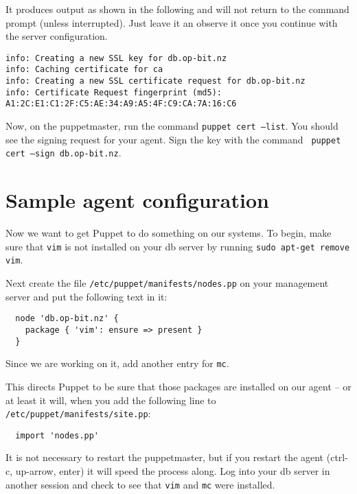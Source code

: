 \documentclass{article}
\newcommand{\domain}{op-bit.nz}
\begin{document}
It produces output as shown in the following and will not return to the command prompt (unless interrupted). Just leave it an observe it once you continue with the server configuration.

\begin{verbatim}
info: Creating a new SSL key for db.op-bit.nz
info: Caching certificate for ca
info: Creating a new SSL certificate request for db.op-bit.nz
info: Certificate Request fingerprint (md5): A1:2C:E1:C1:2F:C5:AE:34:A9:A5:4F:C9:CA:7A:16:C6

\end{verbatim}

Now, on the puppetmaster, run the command \texttt{puppet cert --list}.  You should see the signing request for your agent.  Sign the key with the command \texttt{ puppet cert --sign db.\domain}.

\section{Sample agent configuration}
Now we want to get Puppet to do something on our systems.  To begin, make sure that \texttt{vim} is not installed on your db server by running \texttt{sudo apt-get remove vim}. 

Next create the file \texttt{/etc/puppet/manifests/nodes.pp} on your management server and put the following text in it:
\begin{verbatim}
  node 'db.op-bit.nz' {
    package { 'vim': ensure => present }
  }
\end{verbatim}

Since we are working on it, add another entry for \texttt{mc}.

This directs Puppet to be sure that those packages are installed on our agent -- or at least it will, when you add the following line to \texttt{/etc/puppet/manifests/site.pp}:

\begin{verbatim}
  import 'nodes.pp'
\end{verbatim}

It is not necessary to restart the puppetmaster, but if you restart the agent (ctrl-c, up-arrow, enter) it will speed the process along.  Log into your db server in another session and check to see that \texttt{vim} and \texttt{mc} were installed. 
\end{document}
